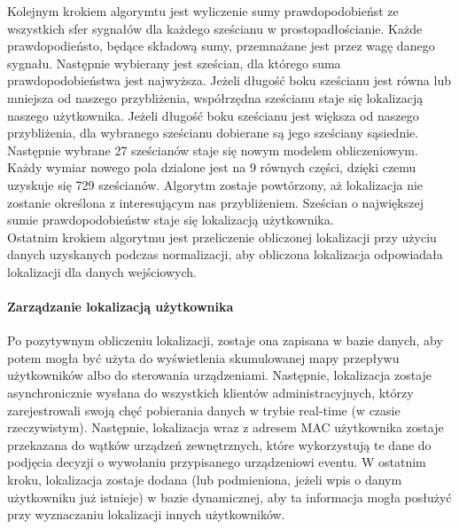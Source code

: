 \documentclass{article}
\begin{document}
		Kolejnym krokiem algorymtu jest wyliczenie sumy prawdopodobieńst ze wszystkich sfer sygnałów dla każdego sześcianu w prostopadłościanie. Każde prawdopodieństo, będące składową sumy, przemnażane jest przez wagę danego sygnału. Następnie wybierany jest sześcian, dla którego suma prawdopodobieństwa jest najwyższa. Jeżeli długość boku sześcianu jest równa lub mniejsza od naszego przybliżenia, współrzędna sześcianu staje się lokalizacją naszego użytkownika. Jeżeli długość boku sześcianu jest większa od naszego przybliżenia, dla wybranego sześcianu dobierane są jego sześciany sąsiednie. Następnie wybrane 27 sześcianów staje się nowym modelem obliczeniowym. Każdy wymiar nowego pola dzialone jest na 9 równych części, dzięki czemu uzyskuje się 729 sześcianów. Algorytm zostaje powtórzony, aż lokalizacja nie zostanie określona z interesującym nas przybliżeniem. Sześcian o największej sumie prawdopodobieństw staje się lokalizacją użytkownika.\\
		Ostatnim krokiem algorytmu jest przeliczenie obliczonej lokalizacji przy użyciu danych uzyskanych podczas normalizacji, aby obliczona lokalizacja odpowiadała lokalizacji dla danych wejściowych.
		\paragraph{Zarządzanie lokalizacją użytkownika}
		Po pozytywnym obliczeniu lokalizacji, zostaje ona zapisana w bazie danych, aby potem mogła być użyta do wyświetlenia skumulowanej mapy przepływu użytkowników albo do sterowania urządzeniami. Następnie, lokalizacja zostaje asynchronicznie wysłana do wszystkich klientów administracyjnych, którzy zarejestrowali swoją chęć pobierania danych w trybie real-time (w czasie rzeczywistym). Następnie, lokalizacja wraz z adresem MAC użytkownika zostaje przekazana do wątków urządzeń zewnętrznych, które wykorzystują te dane do podjęcia decyzji o wywołaniu przypisanego urządzeniowi eventu. W ostatnim kroku, lokalizacja zostaje dodana (lub podmieniona, jeżeli wpis o danym użytkowniku już istnieje) w bazie dynamicznej, aby ta informacja mogła posłużyć przy wyznaczaniu lokalizacji innych użytkowników.
\end{document}
